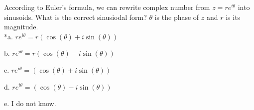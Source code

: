 
According to Euler's formula, we can rewrite complex number from
\(z = r{e}^{i\theta}\) into sinusoids. What is the correct sinusiodal form?
\(\theta\) is the phase of \(z\) and \(r\) is its magnitude.\\

*a. \(re^{i\theta} = r(\cos(\theta) + i\sin(\theta))\)

b. \(re^{i\theta} = r(\cos(\theta) - i\sin(\theta))\)

c. \(re^{i\theta} = (\cos(\theta) + i\sin(\theta))\)

d. \(re^{i\theta} = (\cos(\theta) - i\sin(\theta))\)

e. I do not know.\\
